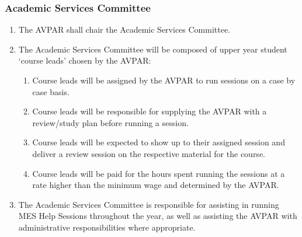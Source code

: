 \subsubsection{Academic Services Committee}
\label{academic-services-committee}
\begin{enumerate}
 \item
  The AVPAR shall chair the Academic Services Committee.
 \item
  The Academic Services Committee will be composed of upper year student `course leads' chosen by the AVPAR:

  \begin{enumerate}
   \item
    Course leads will be assigned by the AVPAR to run sessions on a case by case basis.
   \item
    Course leads will be responsible for supplying the AVPAR with a review/study plan before running a session.
   \item
    Course leads will be expected to show up to their assigned session and deliver a review session on the respective material for the course.
   \item
    Course leads will be paid for the hours spent running the sessions at a rate higher than the minimum wage and determined by the AVPAR.
  \end{enumerate}
 \item
  The Academic Services Committee is responsible for assisting in running MES Help Sessions throughout the year, as well as assisting the AVPAR with administrative responsibilities where appropriate.

\end{enumerate}

